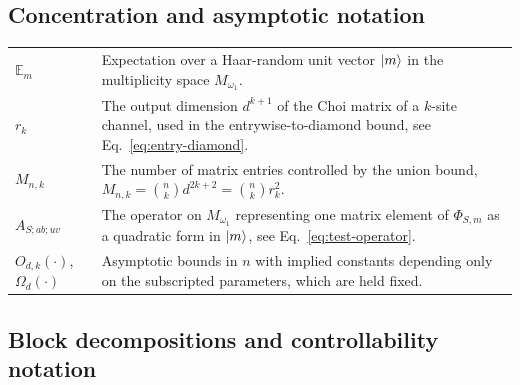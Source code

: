 \documentclass[11pt,letterpaper]{article}
\theoremstyle{plain}
\theoremstyle{plain}
\theoremstyle{plain}
\theoremstyle{plain}
\theoremstyle{plain}
\theoremstyle{plain}
\theoremstyle{plain}
\theoremstyle{definition}
\theoremstyle{plain}
\begin{document}
\subsection*{Concentration and asymptotic notation}

\begin{tabular}{@{}ll@{}}

\parbox[t]{0.22\textwidth}{$\mathbb E_m$} & \parbox[t]{0.72\textwidth}{Expectation over a Haar-random unit vector $\ket m$ in the multiplicity space $M_{\omega_1}$.} \\[0.6em]

\parbox[t]{0.22\textwidth}{$r_k$} & \parbox[t]{0.72\textwidth}{The output dimension $d^{k+1}$ of the Choi matrix of a $k$-site channel, used in the entrywise-to-diamond bound, see Eq.~\eqref{eq:entry-diamond}.} \\[0.6em]

\parbox[t]{0.22\textwidth}{$M_{n,k}$} & \parbox[t]{0.72\textwidth}{The number of matrix entries controlled by the union bound, $M_{n,k}=\binom nkd^{2k+2}=\binom nkr_k^2$.} \\[0.6em]

\parbox[t]{0.22\textwidth}{$A_{S;ab;uv}$} & \parbox[t]{0.72\textwidth}{The operator on $M_{\omega_1}$ representing one matrix element of $\Phi_{S,m}$ as a quadratic form in $\ket m$, see Eq.~\eqref{eq:test-operator}.} \\[0.6em]

\parbox[t]{0.22\textwidth}{$O_{d,k}(\cdot)$, $\Omega_d(\cdot)$} & \parbox[t]{0.72\textwidth}{Asymptotic bounds in $n$ with implied constants depending only on the subscripted parameters, which are held fixed.} \\[0.6em]

\end{tabular}


\subsection*{Block decompositions and controllability notation}
\end{document}
